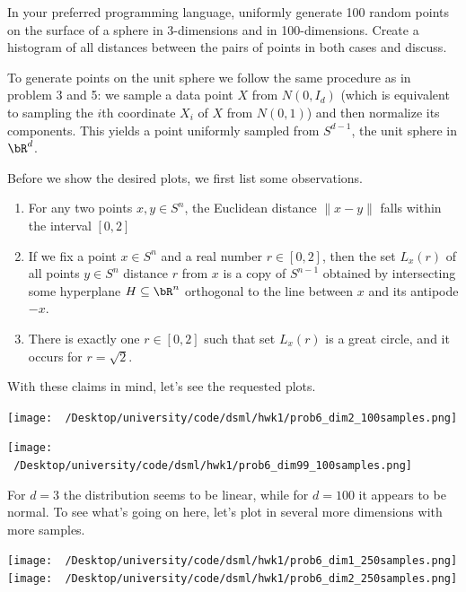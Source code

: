 \begin{homework}[e]
  \prob In your preferred programming language, uniformly generate 100 random points on the surface of a sphere in 3-dimensions and in 100-dimensions. Create a histogram of all distances between the pairs of points in both cases and discuss.
  \begin{soln}
    To generate points on the unit sphere we follow the same procedure as in problem 3 and 5: we sample a data point $X$ from $N(0,I_d)$ (which is equivalent to sampling the $i$th coordinate $X_i$ of $X$ from $N(0,1)$) and then normalize its components. This yields a point uniformly sampled from $S^{d-1}$, the unit sphere in $\bR^d$.

    Before we show the desired plots, we first list some observations.
    \begin{enumerate}[(1)]
      \item For any two points $x,y \in S^n$, the Euclidean distance $\|x - y\|$ falls within the interval $[0,2]$
      \item If we fix a point $x \in S^n$ and a real number $r \in [0,2]$, then the set $L_x(r)$ of all points $y \in S^n$ distance $r$ from $x$ is a copy of $S^{n-1}$ obtained by intersecting some hyperplane $H \subseteq \bR^n$ orthogonal to the line between $x$ and its antipode $-x$.
      \item There is exactly one $r \in [0,2]$ such that set $L_x(r)$ is a great circle, and it occurs for $r = \sqrt{2}$.
    \end{enumerate}
    With these claims in mind, let's see the requested plots.
    \begin{center}
      \texttt{[image: ~/Desktop/university/code/dsml/hwk1/prob6\_dim2\_100samples.png]}
      \label{fig:prob6-1}
    \end{center}
    \begin{center}
      \texttt{[image: ~/Desktop/university/code/dsml/hwk1/prob6\_dim99\_100samples.png]}
      \label{fig:prob6-2}
    \end{center}
    For $d = 3$ the distribution seems to be linear, while for $d = 100$ it appears to be normal. To see what's going on here, let's plot in several more dimensions with more samples.
    \begin{center}
      \texttt{[image: ~/Desktop/university/code/dsml/hwk1/prob6\_dim1\_250samples.png]}
      \texttt{[image: ~/Desktop/university/code/dsml/hwk1/prob6\_dim2\_250samples.png]}

\end{center}
\end{soln}
\end{homework}
